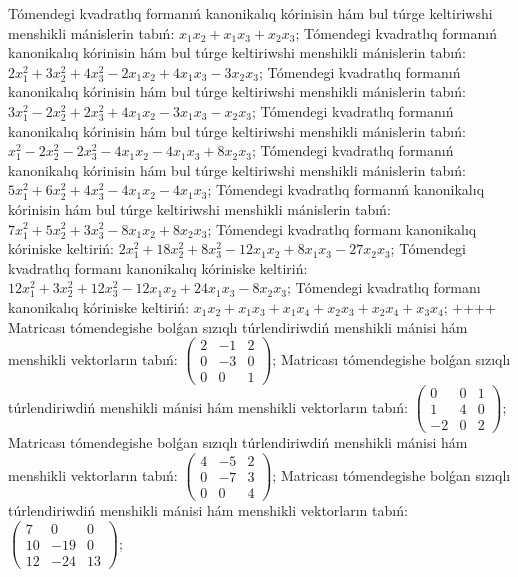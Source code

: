 Tómendegi kvadratlıq formanıń kanonikalıq kórinisin hám bul túrge keltiriwshi menshikli mánislerin tabıń: \(x_{1}x_{2} + x_{1}x_{3} + x_{2}x_{3}\);
Tómendegi kvadratlıq formanıń kanonikalıq kórinisin hám bul túrge keltiriwshi menshikli mánislerin tabıń: \(2x_{1}^{2} + 3x_{2}^{2} + 4x_{3}^{2} - 2x_{1}x_{2} + 4x_{1}x_{3} - 3x_{2}x_{3}\);
Tómendegi kvadratlıq formanıń kanonikalıq kórinisin hám bul túrge keltiriwshi menshikli mánislerin tabıń: \(3x_{1}^{2} - 2x_{2}^{2} + 2x_{3}^{2} + 4x_{1}x_{2} - 3x_{1}x_{3} - x_{2}x_{3}\);
Tómendegi kvadratlıq formanıń kanonikalıq kórinisin hám bul túrge keltiriwshi menshikli mánislerin tabıń: \(x_{1}^{2} - 2x_{2}^{2} - 2x_{3}^{2} - 4x_{1}x_{2} - 4x_{1}x_{3} + 8x_{2}x_{3}\);
Tómendegi kvadratlıq formanıń kanonikalıq kórinisin hám bul túrge keltiriwshi menshikli mánislerin tabıń: \(5x_{1}^{2} + 6x_{2}^{2} + 4x_{3}^{2} - 4x_{1}x_{2} - 4x_{1}x_{3}\);
Tómendegi kvadratlıq formanıń kanonikalıq kórinisin hám bul túrge keltiriwshi menshikli mánislerin tabıń: \(7x_{1}^{2} + 5x_{2}^{2} + 3x_{3}^{2} - 8x_{1}x_{2} + 8x_{2}x_{3}\);
Tómendegi kvadratlıq formanı kanonikalıq kóriniske keltiriń: \(2x_{1}^{2} + 18x_{2}^{2} + 8x_{3}^{2} - 12x_{1}x_{2} + 8x_{1}x_{3} - 27x_{2}x_{3}\);
Tómendegi kvadratlıq formanı kanonikalıq kóriniske keltiriń: \(12x_{1}^{2} + 3x_{2}^{2} + 12x_{3}^{2} - 12x_{1}x_{2} + 24x_{1}x_{3} - 8x_{2}x_{3}\);
Tómendegi kvadratlıq formanı kanonikalıq kóriniske keltiriń: \(x_{1}x_{2} + x_{1}x_{3} + x_{1}x_{4} + x_{2}x_{3} + x_{2}x_{4} + x_{3}x_{4}\);
++++
Matricası tómendegishe bolǵan sızıqlı túrlendiriwdiń menshikli mánisi hám menshikli vektorların tabıń: \(\begin{pmatrix} 2 & - 1 & 2 \\ 0 & - 3 & 0 \\ 0 & 0 & 1 \end{pmatrix}\);
Matricası tómendegishe bolǵan sızıqlı túrlendiriwdiń menshikli mánisi hám menshikli vektorların tabıń: \(\begin{pmatrix} 0 & 0 & 1 \\ 1 & 4 & 0 \\  - 2 & 0 & 2 \end{pmatrix}\);
Matricası tómendegishe bolǵan sızıqlı túrlendiriwdiń menshikli mánisi hám menshikli vektorların tabıń: \(\begin{pmatrix} 4 & - 5 & 2 \\ 0 & - 7 & 3 \\ 0 & 0 & 4 \end{pmatrix}\);
Matricası tómendegishe bolǵan sızıqlı túrlendiriwdiń menshikli mánisi hám menshikli vektorların tabıń: \(\begin{pmatrix} 7 & 0 & 0 \\ 10 & - 19 & 0 \\ 12 & - 24 & 13 \end{pmatrix}\);
